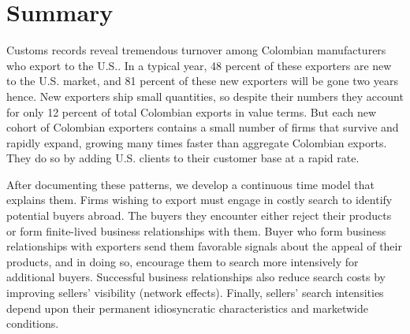 \pagebreak %
%
% 
% 
% 


\section{Summary}

Customs records reveal tremendous turnover among Colombian manufacturers who
export to the U.S.. In a typical year, 48 percent of these exporters are new
to the U.S. market, and 81 percent of these new exporters will be gone two
years hence. New exporters ship small quantities, so despite their numbers
they account for only 12 percent of total Colombian exports in value terms.
But each new cohort of Colombian exporters contains a small
number of firms that survive and rapidly expand, growing many times faster
than aggregate Colombian exports. They do so by adding U.S. clients to their
customer base at a rapid rate.

After documenting these patterns, we develop a continuous time model that
explains them. Firms wishing to export must engage in costly search to
identify potential buyers abroad. The buyers they encounter either reject
their products or form finite-lived business relationships with them. Buyer
who form business relationships with exporters send them favorable signals
about the appeal of their products, and in doing so, encourage them to
search more intensively for additional buyers. Successful business
relationships also reduce search costs by improving sellers' visibility
(network effects). Finally, sellers' search intensities depend upon their
permanent idiosyncratic characteristics and marketwide conditions.

